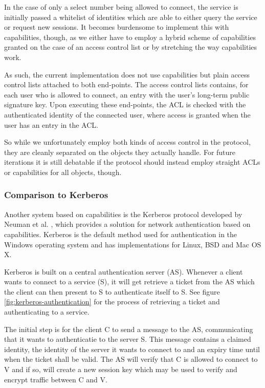 In the case of only a select number being allowed to connect, the service is initially passed a whitelist of identities which are able to either query the service or request new sessions.
It becomes burdensome to implement this with capabilities, though, as we either have to employ a hybrid scheme of capabilities granted on the case of an access control list or by stretching the way capabilities work.

As such, the current implementation does not use capabilities but plain access control lists attached to both end-points.
The access control lists contains, for each user who is allowed to connect, an entry with the user's long-term public signature key.
Upon executing these end-points, the ACL is checked with the authenticated identity of the connected user, where access is granted when the user has an entry in the ACL.

So while we unfortunately employ both kinds of access control in the protocol, they are cleanly separated on the objects they actually handle.
For future iterations it is still debatable if the protocol should instead employ straight ACLs or capabilities for all objects, though.

\subsubsection{Comparison to Kerberos}
\label{sec:kerberos}

Another system based on capabilities is the Kerberos protocol developed by Neuman et al. \cite{neuman1994kerberos,neuman2005rfc}, which provides a solution for network authentication based on capabilities.
Kerberos is the default method used for authentication in the Windows operating system and has implementations for Linux, BSD and Mac OS X.

Kerberos is built on a central authentication server (AS).
Whenever a client wants to connect to a service (S), it will get retrieve a ticket from the AS which the client can then present to S to authenticate itself to S.
See figure \ref{fig:kerberos-authentication} for the process of retrieving a ticket and authenticating to a service.

The initial step is for the client C to send a message to the AS, communicating that it wants to authenticatie to the server S.
This message contains a claimed identity, the identity of the server it wants to connect to and an expiry time until when the ticket shall be valid.
The AS will verify that C is allowed to connect to V and if so, will create a new session key which may be used to verify and encrypt traffic between C and V.

